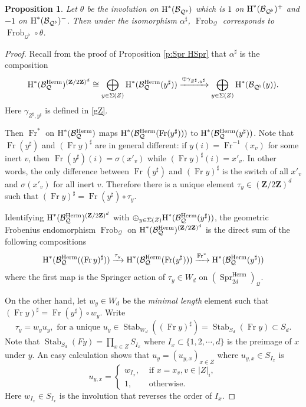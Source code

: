 \documentclass[reqno]{amsart}
\numberwithin{equation}{section}
\newcommand{\Z}{\mathbf{Z}}
\DeclareMathOperator{\gFrob}{Frob}
\DeclareMathOperator{\Fr}{Fr}
\DeclareMathOperator{\Stab}{Stab}
\DeclareMathOperator{\Herm}{Herm}
\DeclareMathOperator{\Spr}{Spr}
\newcommand\Sig{\Sigma}
\newcommand\xr{\xrightarrow}
\newcommand\op{\oplus}
\renewcommand\c{\circ}
\newcommand{\cohog}[2]{\textup{H}^{#1}({#2})}     %
\renewcommand\a\alpha
\newcommand\g\gamma
\renewcommand{\th}{\theta}
\newcommand{\s}{\sigma}
\renewcommand{\t}{\tau}
\newcommand\sh{\sharp}
\newcommand\cB{\mathcal{B}}
\newcommand\cQ{\mathcal{Q}}
\newtheorem{prop}[thm]{Proposition}
\theoremstyle{remark}
\numberwithin{equation}{section}
\begin{document}
\begin{prop}\label{p:trace relation}  Let $\th$ be the involution on $\cohog{*}{\cB_{\cQ^{\flat}}}$ which is $1$ on $\cohog{*}{\cB_{\cQ^{\flat}}}^{+}$ and $-1$ on $\cohog{*}{\cB_{\cQ^{\flat}}}^{-}$. Then under the isomorphism $\a^{\sh}$, $\gFrob_{\cQ}$ corresponds to $\gFrob_{\cQ^{\flat}}\c\th$.
\end{prop}
\begin{proof} Recall from the proof of Proposition \ref{p:Spr HSpr} that $\a^{\sh}$ is the composition
\begin{equation*}
\cohog{*}{\cB_{\cQ}^{\Herm}}^{(\Z/2\Z)^{d}}\cong \bigoplus_{y\in \Sig(Z)}\cohog{*}{\cB^{\Herm}_{\cQ}(y^{\sh})}\xr{\op\g_{Z^{\sh}, y^{\sh}}}\bigoplus_{y\in \Sig(Z)}\cohog{*}{\cB_{\cQ^{\flat}}(y)}.
\end{equation*}
Here $\g_{Z^{\sh},y^{\sh}}$ is defined in \eqref{gZ}.


Then $\Fr^{*}$ on $\cohog{*}{\cB^{\Herm}_{\cQ}}$ maps $\cohog{*}{\cB^{\Herm}_{\cQ}(\Fr(y^{\sh}))}$ to $\cohog{*}{\cB^{\Herm}_{\cQ}(y^{\sh})}$. Note that $\Fr(y^{\sh})$ and $(\Fr y)^{\sh}$ are in general different: if $y(i)=\Fr^{-1}(x_{v})$ for some inert  $v$, then $\Fr(y^{\sh})(i)=\s(x'_{v})$ while $(\Fr y)^{\sh}(i)=x'_{v}$. In other words, the only difference between $\Fr (y^{\sh})$ and $(\Fr y)^{\sh}$ is the switch of all $x'_{v}$ and $\s(x'_{v})$ for all inert $v$. Therefore there is a unique element $\t_{y}\in(\Z/2\Z)^{d}$ such that $(\Fr y)^{\sh}=\Fr (y^{\sh})\c \t_{y}$.

Identifying $\cohog{*}{\cB_{\cQ}^{\Herm}}^{(\Z/2\Z)^{d}}$ with $\op_{y\in \Sig(Z)}\cohog{*}{\cB_{\cQ}^{\Herm}(y^{\sh})}$, the geometric Frobenius endomorphism $\gFrob_{\cQ}$ on $\cohog{*}{\cB_{\cQ}^{\Herm}}^{(\Z/2\Z)^{d}}$ is the direct sum of the following compositions
\begin{equation*}
\cohog{*}{\cB_{\cQ}^{\Herm}((\Fr y)^{\sh})}\xr{\t_{y}}\cohog{*}{\cB_{\cQ}^{\Herm}(\Fr (y^{\sh}))} \xr{\Fr^{*}}\cohog{*}{\cB_{\cQ}^{\Herm}(y^{\sh})}
\end{equation*}
where the first map is the Springer action of $\t_{y}\in W_{d}$ on $(\Spr^{\Herm}_{2d})_{\cQ}$.

On the other hand, let $w_{y}\in W_{d}$ be the {\em minimal length} element such that $(\Fr y)^{\sh}= \Fr(y^{\sh})\c w_{y}$. Write
\begin{equation*}
\t_{y}=w_{y}u_{y}, \mbox{ for a unique } u_{y}\in \Stab_{W_{d}}((\Fr y)^{\sh})=\Stab_{S_{d}}(\Fr y)\subset S_{d}.
\end{equation*}
Note that $\Stab_{S_{d}}(Fy)=\prod_{x\in Z}S_{I_{x}}$ where $I_{x}\subset \{1,2,\cdots, d\}$ is the preimage of $x$ under $y$. An easy calculation shows that $u_{y}=(u_{y,x})_{x\in Z}$ where  $u_{y,x}\in S_{I_{x}}$ is 
\begin{equation*}
u_{y,x}=\begin{cases} w_{I_{x}}, & \mbox{ if }x=x_{v}, v\in |Z|_{i},\\ 1, & \mbox{ otherwise.}\end{cases}
\end{equation*}
Here $w_{I_{x}}\in S_{I_{x}}$ is the involution that reverses the order of $I_{x}$. 



\end{proof}
\end{document}
